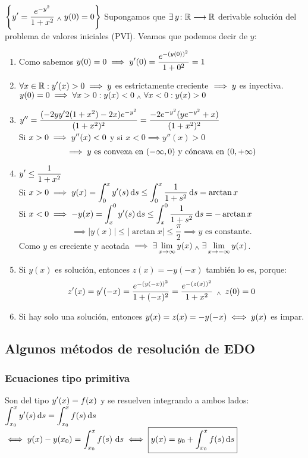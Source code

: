 \begin{ejem}
	$\displaystyle \left\{y' = \frac{e^{-y^2}}{1+x^2} \; _{\wedge} \; y(0)=0\right\}$
	Supongamos que $\displaystyle\exists\,y \colon \mathbb{R} \longrightarrow \mathbb{R}$ derivable solución del problema de valores iniciales (PVI). Veamos que podemos decir de $y$:
	\begin{enumerate}
		\item Como sabemos $\displaystyle y(0)=0 \implies y'(0)=\frac{e^{-(y(0))^2}}{1+0^2}=1$
		\item $\displaystyle \forall x \in \mathbb{R} : y'(x)>0 \implies y$ es estrictamente creciente $\displaystyle\implies y$ es inyectiva. \\
		      $\displaystyle y(0)=0 \implies \forall x>0 : y(x)<0 \; _{\wedge} \; \forall x<0 : y(x)>0$
		\item $\displaystyle y''=\frac{(-2yy'2(1+x^2)-2x)e^{-y^2}}{(1+x^2)^2}=\frac{-2e^{-y^2}(ye^{-y^2}+x)}{(1+x^2)^2}$ \\
		      Si $\displaystyle x>0 \implies y''(x)<0$ y si $x<0 \implies y''(x)>0$
		      \[ \implies y \text{ es convexa en } (-\infty, 0) \text{ y cóncava en }(0, +\infty)\]
		\item $\displaystyle y' \leq \frac{1}{1+x^2}$ \\
		      Si $\ds x>0 \implies y(x)=\int_0^x y'(s)\odif{s}\leq\int_0^x \frac{1}{1+s^2}\odif{s}=\arctan{x}$ \\
		      Si $\ds x<0 \implies -y(x)=\int_x^0 y'(s)\odif{s}\leq\int_x^0 \frac{1}{1+s^2}\odif{s}=-\arctan{x}$ \\
		      \[\implies |y(x)| \leq |\arctan{x}| \leq \frac{\pi}{2} \implies y \text{ es constante.}\]
		      Como $y$ es creciente y acotada $\displaystyle\implies \exists\lim_{x\to\infty} y(x) \; _{\wedge} \; \exists\lim_{x\to-\infty} y(x)$.
		\item Si $y(x)$ es solución, entonces $z(x)=-y(-x)$ también lo es, porque:
		      \[z'(x)=y'(-x)=\frac{e^{-(y(-x))^2}}{1+(-x)^2}=\frac{e^{-(z(x))^2}}{1+x^2} \,\; _{\wedge} \; \, z(0)=0\]
		\item Si hay solo una solución, entonces $\displaystyle y(x)=z(x)=-y(-x)\iff y(x)$ es impar.
	\end{enumerate}
	\ifdraft{\vspace{5cm}}{}
\end{ejem}
\subsection{Algunos métodos de resolución de EDO}
\subsubsection{Ecuaciones tipo primitiva}
Son del tipo $\displaystyle y'(x)=f(x)$ y se resuelven integrando a ambos lados: $\ds \int_{x_0}^x y'(s)\odif{s}=\int_{x_0}^x f(s) \odif{s}$
$\ds \iff y(x)-y(x_0)=\int_{x_0}^x f(s) \,\odif{s} \iff \boxed{y(x) = y_0 + \int_{x_0}^x f(s)\odif{s}}$
